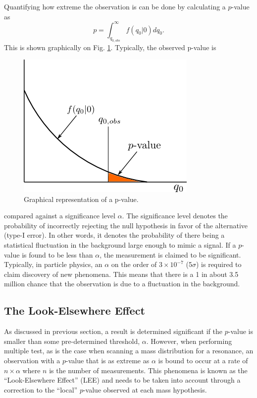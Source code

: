 Quantifying how extreme the observation is can be done by calculating a $p$-value as
\begin{equation}
    p = \int_{q_{0,obs}}^{\infty} f(q_{0} | 0) dq_{0}.
\end{equation} 
This is shown graphically on Fig. \ref{fig:p_value}.  Typically, the observed 
p-value is
\begin{figure}[t]
    \centering
    \includegraphics[width=.5\textwidth]{images/p_value.png}
    \caption{Graphical representation of a p-value.}
    \label{fig:p_value}
\end{figure}
compared against a significance level $\alpha$.  The significance level denotes
the probability of incorrectly rejecting the null hypothesis in favor of the 
alternative (type-I error).  In other words, it denotes the probability of there
being a statistical fluctuation in the background large enough to mimic a signal.  
If a $p$-value is 
found to be less than $\alpha$, the measurement is claimed to be significant. 
Typically, in particle 
physics, an $\alpha$ on the order of $3 \times 10^{-7}$ (5$\sigma$) is required
to claim discovery of new phenomena.  This means that there is a 1 in 
about 3.5 million chance that the observation is due to a fluctuation in the background.

\subsection{The Look-Elsewhere Effect}

As discussed in previous section, a result is determined significant if the 
$p$-value is smaller than some pre-determined threshold, $\alpha$.  However, 
when performing multiple test, as is the case when scanning a mass distribution
for a resonance, an observation with a $p$-value that is as extreme as $\alpha$
is bound to occur at a rate of $n\times\alpha$ where $n$ is the number of measurements.
This phenomena is known as the ``Look-Elsewhere Effect'' (LEE)
and needs to be taken into account through a correction to the ``local'' $p$-value
observed at each mass hypothesis.

